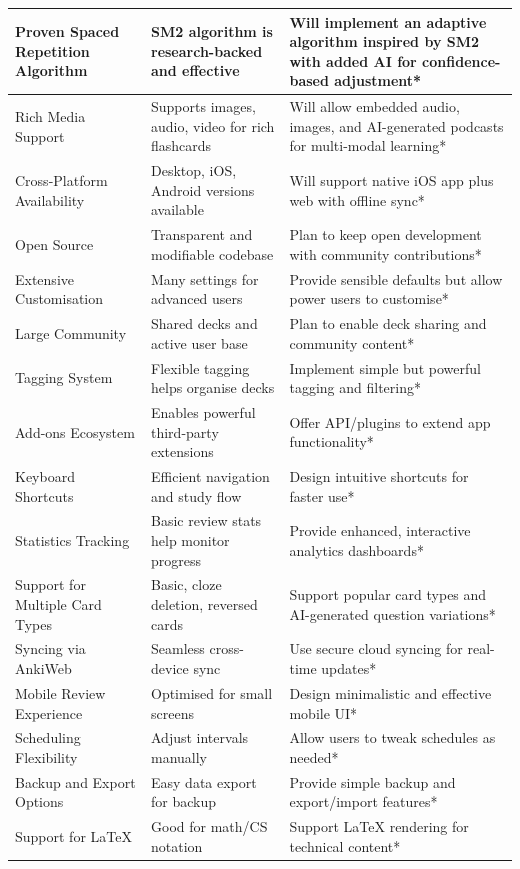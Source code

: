 \documentclass[a4paper,12pt]{article}
\begin{document}
\begin{ThreePartTable}
\begin{longtable}{|p{3.5cm}|>{\raggedright\arraybackslash}p{5.5cm}|>{\raggedright\arraybackslash}p{5.5cm}|}
Proven Spaced Repetition Algorithm & SM2 algorithm is research-backed and effective & Will implement an adaptive algorithm inspired by SM2 with added AI for confidence-based adjustment* \\
\hline
Rich Media Support & Supports images, audio, video for rich flashcards & Will allow embedded audio, images, and AI-generated podcasts for multi-modal learning* \\
\hline
Cross-Platform Availability & Desktop, iOS, Android versions available & Will support native iOS app plus web with offline sync* \\
\hline
Open Source & Transparent and modifiable codebase & Plan to keep open development with community contributions* \\
\hline
Extensive Customisation & Many settings for advanced users & Provide sensible defaults but allow power users to customise* \\
\hline
Large Community & Shared decks and active user base & Plan to enable deck sharing and community content* \\
\hline
Tagging System & Flexible tagging helps organise decks & Implement simple but powerful tagging and filtering* \\
\hline
Add-ons Ecosystem & Enables powerful third-party extensions & Offer API/plugins to extend app functionality* \\
\hline
Keyboard Shortcuts & Efficient navigation and study flow & Design intuitive shortcuts for faster use* \\
\hline
Statistics Tracking & Basic review stats help monitor progress & Provide enhanced, interactive analytics dashboards* \\
\hline
Support for Multiple Card Types & Basic, cloze deletion, reversed cards & Support popular card types and AI-generated question variations* \\
\hline
Syncing via AnkiWeb & Seamless cross-device sync & Use secure cloud syncing for real-time updates* \\
\hline
Mobile Review Experience & Optimised for small screens & Design minimalistic and effective mobile UI* \\
\hline
Scheduling Flexibility & Adjust intervals manually & Allow users to tweak schedules as needed* \\
\hline
Backup and Export Options & Easy data export for backup & Provide simple backup and export/import features* \\
\hline
Support for LaTeX & Good for math/CS notation & Support LaTeX rendering for technical content* \\

\end{longtable}
\end{ThreePartTable}
\end{document}
